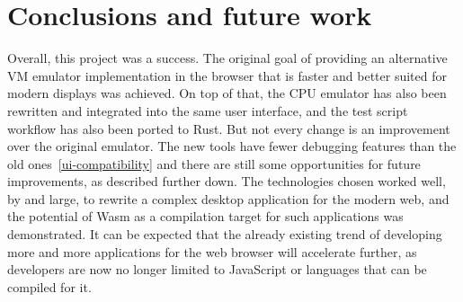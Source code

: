 \section{Conclusions and future work}
Overall, this project was a success.
The original goal of providing an alternative VM emulator implementation in the browser that is faster and better suited for modern displays was achieved.
On top of that, the CPU emulator has also been rewritten and integrated into the same user interface, and the test script workflow has also been ported to Rust.
But not every change is an improvement over the original emulator.
The new tools have fewer debugging features than the old ones~\ref{ui-compatibility} and there are still some opportunities for future improvements, as described further down.
The technologies chosen worked well, by and large, to rewrite a complex desktop application for the modern web, and the potential of Wasm as a compilation target for such applications was demonstrated.
It can be expected that the already existing trend of developing more and more applications for the web browser will accelerate further, as developers are now no longer limited to JavaScript or languages that can be compiled for it.

